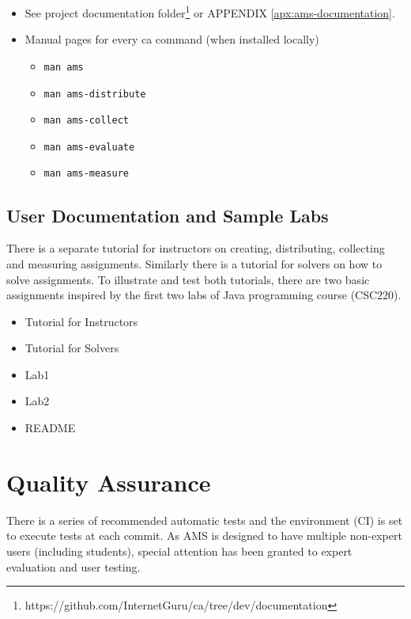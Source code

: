 \begin{itemize}
\item
  {See project documentation folder\footnote{https://github.com/InternetGuru/ca/tree/dev/documentation} or APPENDIX \ref{apx:ams-documentation}.}
\item
  {Manual pages for every ca command (when installed locally)}
  \begin{itemize}
  \item
    {\texttt{man ams}}
  \item
    {\texttt{man ams-distribute}}
  \item
    {\texttt{man ams-collect}}
  \item
    {\texttt{man ams-evaluate}}
  \item
    {\texttt{man ams-measure}}
  \end{itemize}
\end{itemize}

\subsection{User Documentation and Sample Labs}\label{ssec:userdocandlabs}

{There is a separate tutorial for instructors on creating, distributing, collecting and measuring assignments. Similarly there is a tutorial for solvers on how to solve assignments. To illustrate and test both tutorials, there are two basic assignments inspired by the first two labs of Java programming course (CSC220).}

\begin{itemize}
\item
  {Tutorial for Instructors}
\item
  {Tutorial for Solvers}
\item
  {Lab1}
\item
  {Lab2}
\item
  {README}
\end{itemize}

\section{Quality Assurance}\label{sec:qa}

{There is a series of recommended automatic tests and the environment (CI) is set to execute tests at each commit. As AMS is designed to have multiple non-expert users (including students), special attention has been granted to expert evaluation and user testing.}

